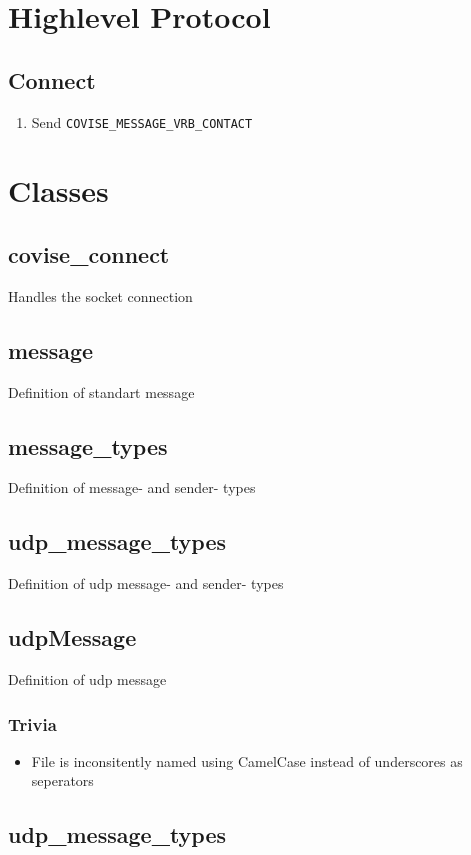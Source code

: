 \section{Highlevel Protocol}

\subsection{Connect}

\begin{enumerate}
	\item Send \lstinline|COVISE_MESSAGE_VRB_CONTACT|	
\end{enumerate}


\section{Classes}

\subsection{covise\_connect}

Handles the socket connection 

\subsection{message}

Definition of standart message

\subsection{message\_types}

Definition of message- and sender- types 

\subsection{udp\_message\_types}
Definition of udp message- and sender- types 

\subsection{udpMessage}
Definition of udp message


\subsubsection{Trivia}

\begin{itemize}
	\item File is inconsitently named using CamelCase instead of underscores as seperators
\end{itemize}

\subsection{udp\_message\_types}
